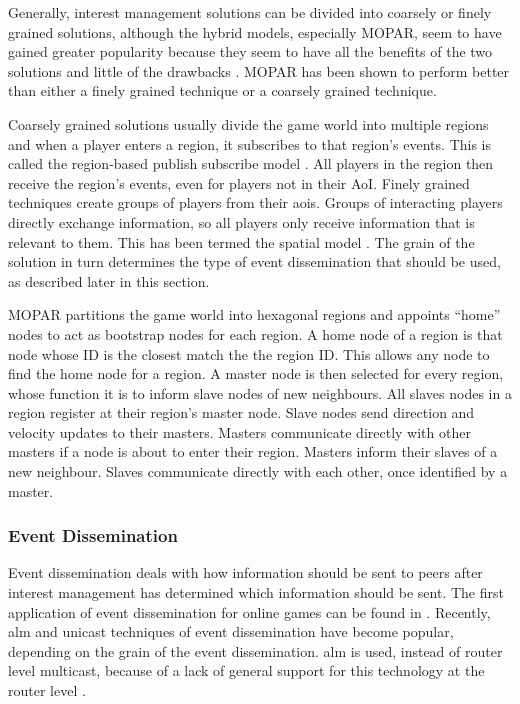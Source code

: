 \documentclass[journal,oneside,a4paper,onecolumn]{IEEEtran}
\begin{document}
Generally, interest management solutions can be divided into coarsely or finely grained solutions, although the hybrid models, especially MOPAR, seem to have gained greater popularity because they seem to have all the benefits of the two solutions and little of the drawbacks \cite{MOPAR}. MOPAR has been shown to perform better than either a finely grained technique or a coarsely grained technique.

Coarsely grained solutions usually divide the game world into multiple regions and when a player enters a region, it subscribes to that region's events. This is called the region-based publish subscribe model \cite{Fan_deisgn_issues_p2p}. All players in the region then receive the region's events, even for players not in their AoI. Finely grained techniques create groups of players from their \acp{aoi}. Groups of interacting players directly exchange information, so all players only receive information that is relevant to them. This has been termed the spatial model \cite{Fan_deisgn_issues_p2p}. The grain of the solution in turn determines the type of event dissemination that should be used, as described later in this section.

MOPAR partitions the game world into hexagonal regions and appoints ``home'' nodes to act as bootstrap nodes for each region. A home node of a region is that node whose ID is the closest match the the region ID. This allows any node to find the home node for a region. A master node is then selected for every region, whose function it is to inform slave nodes of new neighbours. All slaves nodes in a region register at their region's master node. Slave nodes send direction and velocity updates to their masters. Masters communicate directly with other masters if a node is about to enter their region. Masters inform their slaves of a new neighbour. Slaves communicate directly with each other, once identified by a master.


\subsubsection{Event Dissemination}
Event dissemination deals with how information should be sent to peers after interest management has determined which information should be sent. The first application of event dissemination for online games can be found in \cite{first_GED}. Recently, \ac{alm} and unicast techniques of event dissemination have become popular, depending on the grain of the event dissemination. \ac{alm} is used, instead of router level multicast, because of a lack of general support for this technology at the router level \cite{ip_multicast_deployment_issues}.
\end{document}
